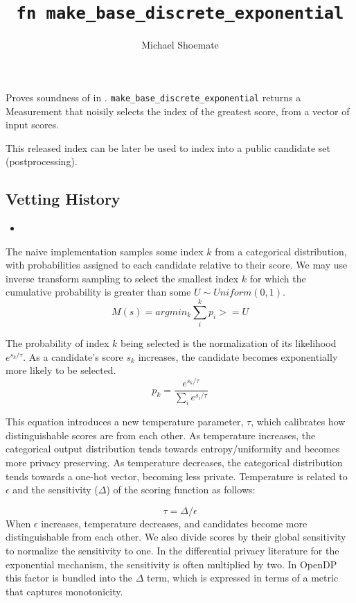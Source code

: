 \documentclass{article}
\title{\texttt{fn make\_base\_discrete\_exponential}}
\author{Michael Shoemate}
\begin{document}
 
\maketitle

\contrib

Proves soundness of  
in .
\texttt{make\_base\_discrete\_exponential} returns a Measurement that 
noisily selects the index of the greatest score, from a vector of input scores.

This released index can be later be used to index into a public candidate set (postprocessing).

\subsection*{Vetting History}
\begin{itemize}
    \item {}
\end{itemize}

The naive implementation samples some index $k$ from a categorical distribution, 
with probabilities assigned to each candidate relative to their score.
We may use inverse transform sampling to select the smallest index $k$ for which the cumulative probability is greater than some $U \sim Uniform(0, 1)$.
\begin{equation} 
    \label{m-naive} 
    M(s) = argmin_k \sum_i^k p_i >= U
\end{equation} 

The probability of index $k$ being selected is the normalization of its likelihood $e^{s_k / \tau}$.
As a candidate's score $s_k$ increases, the candidate becomes exponentially more likely to be selected.
\begin{equation}
    \label{prob-of-k}
    p_k = \frac{e^{s_k / \tau}}{\sum_i e^{s_i / \tau}}
\end{equation}

This equation introduces a new temperature parameter, $\tau$, which calibrates how distinguishable scores are from each other.
As temperature increases, the categorical output distribution tends towards entropy/uniformity and becomes more privacy preserving.
As temperature decreases, the categorical distribution tends towards a one-hot vector, becoming less private.
Temperature is related to $\epsilon$ and the sensitivity ($\Delta$) of the scoring function as follows:

\begin{equation}
    \tau = \Delta / \epsilon
\end{equation}
When $\epsilon$ increases, temperature decreases, and candidates become more distinguishable from each other.
We also divide scores by their global sensitivity to normalize the sensitivity to one.
In the differential privacy literature for the exponential mechanism, the sensitivity is often multiplied by two.
In OpenDP this factor is bundled into the $\Delta$ term, which is expressed in terms of a metric that captures monotonicity.
\end{document}
